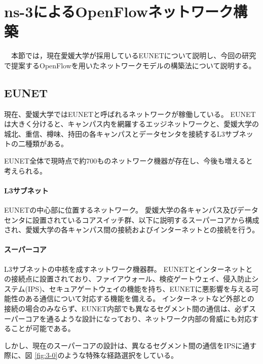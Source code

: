 \chapter{ns-3によるOpenFlowネットワーク構築}

　本節では，現在愛媛大学が採用しているEUNETについて説明し、今回の研究で提案するOpenFlowを用いたネットワークモデルの構築法について説明する。

\section{EUNET}

現在、愛媛大学ではEUNETと呼ばれるネットワークが稼働している。
EUNETは大きく分けると、キャンパス内を網羅するエッジネットワークと、愛媛大学の城北、重信、樽味、持田の各キャンパスとデータセンタを接続するL3サブネットの二種類がある。

EUNET全体で現時点で約700ものネットワーク機器が存在し、今後も増えると考えられる。

\subsubsection{L3サブネット}

EUNETの中心部に位置するネットワーク。
愛媛大学の各キャンパス及びデータセンタに設置されているコアスイッチ群、以下に説明するスーパーコアから構成され、愛媛大学の各キャンパス間の接続およびインターネットとの接続を行う。

\subsubsection{スーパーコア}

L3サブネットの中核を成すネットワーク機器群。
EUNETとインターネットとの接続点に設置されており、ファイアウォール、検疫ゲートウェイ、侵入防止システム(IPS)、セキュアゲートウェイの機能を持ち、EUNETに悪影響を与える可能性のある通信について対応する機能を備える。
インターネットなど外部との接続の場合のみならず、EUNET内部でも異なるセグメント間の通信は、必ずスーパーコアを通るような設計になっており、ネットワーク内部の脅威にも対応することが可能である。

しかし、現在のスーパーコアの設計は、異なるセグメント間の通信をIPSに通す際に、図 \ref{fig:3-0}のような特殊な経路選択をしている。

